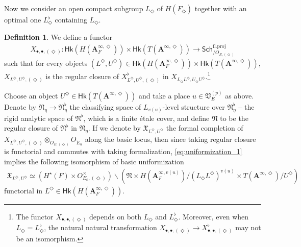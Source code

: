 \documentclass[12pt]{amsart}
\numberwithin{equation}{section}
\theoremstyle{plain}
\theoremstyle{definition}
\newtheorem{definition}[proposition]{Definition}
\theoremstyle{remark}
\renewcommand{\b}[1]{\mathbf{#1}}
\newcommand{\f}[1]{\mathfrak{#1}}
\renewcommand{\r}[1]{\mathrm{#1}}
\renewcommand{\sf}[1]{\mathsf{#1}}
\renewcommand{\(}{\left(}
\renewcommand{\)}{\right)}
\newcommand{\bA}{\b A}
\newcommand{\fN}{\f N}
\newcommand{\fV}{\f V}
\newcommand{\fX}{\f X}
\newcommand{\proj}{\r{fl.proj}}
\newcommand{\Sch}{\sf{Sch}}
\newcommand{\Hk}{\sf{Hk}}
\begin{document}
Now we consider an open compact subgroup $L_\Diamond$ of $H(F_\Diamond)$ together with an optimal one $L_\Diamond^\flat$ containing $L_\Diamond$.

\begin{definition}\label{de:moduli_integral_regular}
We define a functor
\begin{align*}
X_{\bullet,\bullet,(\Diamond)}\colon\Hk(H(\bA_F^{\infty,\Diamond}))\times\Hk(T(\bA^{\infty,\Diamond}))
\to\Sch^\proj_{/O_{E,(\Diamond)}}
\end{align*}
such that for every objects $(L^\Diamond,U^\Diamond)\in\Hk(H(\bA_F^{\infty,\Diamond}))\times\Hk(T(\bA^{\infty,\Diamond}))$, $X_{L^\Diamond,U^\Diamond,(\Diamond)}$ is the regular closure of $X_{L^\Diamond,U^\Diamond,(\Diamond)}^\flat$ in $X_{L_\Diamond L^\Diamond, U_\Diamond U^\Diamond}$.\footnote{The functor $X_{\bullet,\bullet,(\Diamond)}$ depends on both $L_\Diamond$ and $L^\flat_\Diamond$. Moreover, even when $L_\Diamond=L^\flat_\Diamond$, the natural natural transformation $X_{\bullet,\bullet,(\Diamond)}\to X^\flat_{\bullet,\bullet,(\Diamond)}$ may not be an isomorphism.}
\end{definition}






Choose an object $U^\Diamond\in\Hk(T(\bA^{\infty,\Diamond}))$ and take a place $u\in\fV_E^{(p)}$ as above. Denote by $\fN_\eta\to\fN^\flat_\eta$ the classifying space of $L_{v(u)}$-level structure over $\fN^\flat_\eta$ -- the rigid analytic space of $\fN^\flat$, which is a finite \'{e}tale cover, and define $\fN$ to be the regular closure of $\fN^\flat$ in $\fN_\eta$. If we denote by $\fX_{L^\Diamond, U^\Diamond}$ the formal completion of $X_{L^\Diamond,U^\Diamond,(\Diamond)}\otimes_{O_{E,(\Diamond)}}O_{\breve{E}_u}$ along the basic locus, then since taking regular closure is functorial and commutes with taking formalization, \eqref{eq:uniformization_1} implies the following isomorphism of basic uniformization
\begin{align}\label{eq:uniformization_3}
\fX_{L^\Diamond,U^\Diamond}\simeq (H^\star(F)\times O_{E_0,(\Diamond)}^\times)\backslash\(\fN\times H(\bA_F^{\infty,v(u)})/(L_\Diamond L^\Diamond)^{v(u)}\times T(\bA^{\infty,\Diamond})/U^\Diamond\)
\end{align}
functorial in $L^\Diamond\in\Hk(H(\bA_F^{\infty,\Diamond}))$.
\end{document}
